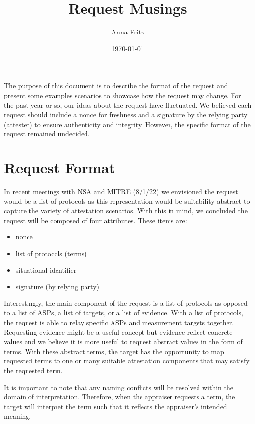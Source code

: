 \documentclass[12pt, letterpaper]{article}
\title{Request Musings}
\author{Anna Fritz}
\date{\today}
\newcommand{\squash}{\itemsep=0pt\parskip=0pt}
\begin{document}
\maketitle
    
The purpose of this document is to describe the format of the request and present some examples scenarios to showcase how the request may change. For the past year or so, our ideas about the request have fluctuated. We believed each request should include a nonce for freshness and a signature by the relying party (attester) to ensure authenticity and integrity. However, the specific format of the request remained undecided. 

\section{Request Format}

In recent meetings with NSA and MITRE (8/1/22) we envisioned the request would be a list of protocols as this representation would be suitability abstract to capture the variety of attestation scenarios. With this in mind, we concluded the request will be composed of four attributes. These items are:

\begin{itemize}
    \squash
    \item nonce
    \item list of protocols (terms)
    \item situational identifier
    \item signature (by relying party) 
\end{itemize}

Interestingly, the main component of the request is a list of protocols as opposed to a list of ASPs, a list of targets, or a list of evidence. With a list of protocols, the request is able to relay specific ASPs and measurement targets together. Requesting evidence might be a useful concept but evidence reflect concrete values and we believe it is more useful to request abstract values in the form of terms. With these abstract terms, the target has the opportunity to map requested terms to one or many suitable attestation components that may satisfy the requested term. 

It is important to note that any naming conflicts will be resolved within the domain of interpretation. Therefore, when the appraiser requests a term, the target will interpret the term such that it reflects the appraiser's intended meaning. 
\end{document}
